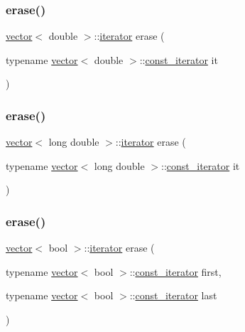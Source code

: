 \mbox{\label{classvector_a35a784da0a4e1fe655e7f012d5e71f99}} 
\subsubsection{\texorpdfstring{erase()}{erase()}\hspace{0.1cm}{\footnotesize\ttfamily [15/28]}}
{\footnotesize\ttfamily \mbox{\hyperlink{classvector}{vector}}$<$ double $>$\+::\mbox{\hyperlink{classvector_a35c955cacac6aacaa1e82874b1628865}{iterator}} erase (\begin{DoxyParamCaption}\item[{typename \mbox{\hyperlink{classvector}{vector}}$<$ double $>$\+::\mbox{\hyperlink{classvector_a2fc97dce62b7053449cc868607540dba}{const\+\_\+iterator}}}]{it }\end{DoxyParamCaption})}

\mbox{\label{classvector_ad81ec050b369debbd709a211b5adfeb8}} 
\subsubsection{\texorpdfstring{erase()}{erase()}\hspace{0.1cm}{\footnotesize\ttfamily [16/28]}}
{\footnotesize\ttfamily \mbox{\hyperlink{classvector}{vector}}$<$ long double $>$\+::\mbox{\hyperlink{classvector_a35c955cacac6aacaa1e82874b1628865}{iterator}} erase (\begin{DoxyParamCaption}\item[{typename \mbox{\hyperlink{classvector}{vector}}$<$ long double $>$\+::\mbox{\hyperlink{classvector_a2fc97dce62b7053449cc868607540dba}{const\+\_\+iterator}}}]{it }\end{DoxyParamCaption})}

\mbox{\label{classvector_a29009439755e7f667b204d6cc9626c53}} 
\subsubsection{\texorpdfstring{erase()}{erase()}\hspace{0.1cm}{\footnotesize\ttfamily [17/28]}}
{\footnotesize\ttfamily \mbox{\hyperlink{classvector}{vector}}$<$ bool $>$\+::\mbox{\hyperlink{classvector_a35c955cacac6aacaa1e82874b1628865}{iterator}} erase (\begin{DoxyParamCaption}\item[{typename \mbox{\hyperlink{classvector}{vector}}$<$ bool $>$\+::\mbox{\hyperlink{classvector_a2fc97dce62b7053449cc868607540dba}{const\+\_\+iterator}}}]{first,  }\item[{typename \mbox{\hyperlink{classvector}{vector}}$<$ bool $>$\+::\mbox{\hyperlink{classvector_a2fc97dce62b7053449cc868607540dba}{const\+\_\+iterator}}}]{last }\end{DoxyParamCaption})}

